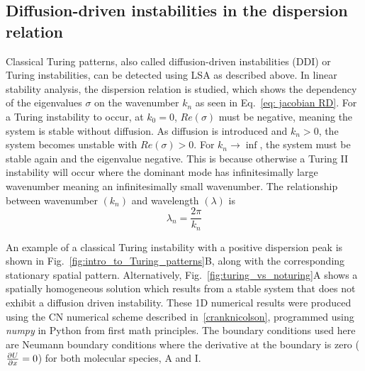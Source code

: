 \subsection{Diffusion-driven instabilities in the dispersion relation}
Classical Turing patterns, also called diffusion-driven instabilities (DDI) or Turing instabilities, can be detected using LSA as described above.
In linear stability analysis, the dispersion relation is studied, which shows the dependency of the eigenvalues $\sigma$ on the wavenumber $k_{n}$ as seen in Eq.~\ref{eq: jacobian RD}.
For a Turing instability to occur, at $k_{0}=0$, $Re(\sigma)$ must be negative, meaning the system is stable without diffusion.
As diffusion is introduced and $k_n>0$, the system becomes unstable with $Re(\sigma)>0$.
For $k_n \rightarrow \inf$, the system must be stable again and the eigenvalue negative.
This is because otherwise a Turing II instability will occur where the dominant mode has infinitesimally large wavenumber meaning an infinitesimally small wavenumber.
The relationship between wavenumber $(k_{n})$ and wavelength $(\lambda)$ is
\begin{equation}
    \lambda_n = \frac{2 \pi}{k_n}
    \label{eq:wavelength_wavenumber}
\end{equation}

An example of a classical Turing instability with a positive dispersion peak is shown in Fig.~\ref{fig:intro_to_Turing_patterns}B, along with the corresponding stationary spatial pattern.
Alternatively, Fig.~\ref{fig:turing_vs_noturing}A shows a spatially homogeneous solution which results from a stable system that does not exhibit a diffusion driven instability.
These 1D numerical results were produced using the \acrfull{CN} numerical scheme described in~\ref{cranknicolson}, programmed using \textit{numpy} in Python from first math principles.
The boundary conditions used here are Neumann boundary conditions where the derivative at the boundary is zero ($\pdv{U}{x}=0$) for both molecular species, A and I.

